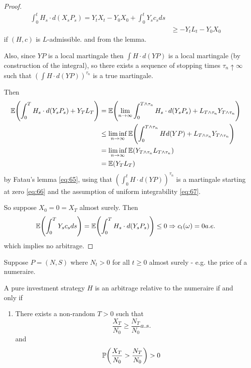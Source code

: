 \begin{proof}
  \begin{align}
    \label{eq:63}
    \int_{0}^{t} H_{s} \cdot d(X_{s} P_{s}) = Y_{t} X_{t} - Y_{0}
    X_{0} + \int_{0}^{t} Y_{s} c_{s} ds \\
    &\geq -Y_{t} L_{t} - Y_{0} X_{0}
  \end{align}  if $(H, c)$ is $L$-admissible. and from the lemma.

  Also, since $YP$ is a local martingale then $\int H \cdot d(YP)$ is
  a local martingale (by construction of the \ito integral), so there
  exists a sequence of stopping times $\tau_{n} \uparrow \infty$ such
  that $(\int H \cdot d(YP))^{\tau_{n}}$ is a true martingale.

  Then
  \begin{align}
    \label{eq:64}
    \E{\int_{0}^{T} H_{s} \cdot d(Y_{s} P_{s}) + Y_{T}L_{T}} &=
    \E{\lim_{n \rightarrow \infty} \int_{0}^{T \wedge \tau_{n}} H_{s}
      \cdot d(Y_{s} P_{s}) + L_{T \wedge \tau_{n}} Y_{T \wedge
        \tau_{n}} } \\
    \label{eq:65}
    &\leq \liminf_{n \rightarrow \infty} \E{\int_{0}^{T \wedge
        \tau_{n}} H d(YP) + L_{T \wedge \tau_{n}} Y_{T \wedge
        \tau_{n}}} \\
    \label{eq:66}
    &= \liminf_{n \rightarrow \infty} \E{Y_{T \wedge \tau_{n}} L_{T
        \wedge \tau_{n}}} \\
    \label{eq:67}
     &= \E{Y_{T} L_{T}}
  \end{align} by Fatau's lemma \eqref{eq:65}, using that $(\int_{0}^{t} H \cdot d(YP))^{\tau_{n}}$ is a
  martingale starting at zero \eqref{eq:66} and the assumption of
  uniform integrability \eqref{eq:67}.

  So suppose $X_{0} = 0 = X_{T}$ almost surely. Then
  \begin{align}
    \label{eq:68}
    \E{\int_{0}^{T} Y_{s} c_{s} ds} = \E{\int_{0}^{T} H_{s} \cdot
      d(Y_{s} P_{s})} \leq 0 \Rightarrow c_{t}(\omega) = 0 a.e.
  \end{align} which implies no arbitrage.
\end{proof}


Suppose $P = (N, S)$ where $N_{t} > 0$ for all $t \geq 0$ almost
surely - e.g. the price of a numeraire.

\begin{defn}
  \label{defn:continuous_time:27}
  A pure investment strategy $H$ is an arbitrage relative to the
  numeraire if and only if
  \begin{enumerate}
  \item There exists a non-random $T > 0$ such that
    \begin{equation}
      \label{eq:69}
      \frac{X_{T}}{N_{0}} \geq \frac{N_{T}}{N_{0}} a.s.
    \end{equation} and
    \begin{equation}
      \label{eq:70}
      \Prob{\frac{X_{T}}{N_{0}} > \frac{N_{T}}{N_{0}}} > 0
    \end{equation}
  \end{enumerate}
\end{defn}

